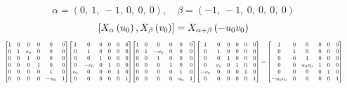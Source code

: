 \documentclass[11pt]{article}
\theoremstyle{definition}
\begin{document}
\[
\alpha = \left( 0, \  1, \  -1, \  0, \  0, \  0\right), \quad \beta = \left( -1, \  -1, \  0, \  0, \  0, \  0\right)
\]
\[
\scaletoalign{\textwidth}{\left[ X_{\alpha}\left(u_{0}\right), X_{\beta}\left(v_{0}\right) \right] = X_{\alpha + \beta}\left(- u_{0} v_{0}\right)}
\]
\[
\scaletoalign{\textwidth}{{\left[\begin{matrix}1 & 0 & 0 & 0 & 0 & 0\\0 & 1 & u_{0} & 0 & 0 & 0\\0 & 0 & 1 & 0 & 0 & 0\\0 & 0 & 0 & 1 & 0 & 0\\0 & 0 & 0 & 0 & 1 & 0\\0 & 0 & 0 & 0 & - u_{0} & 1\end{matrix}\right]} {\left[\begin{matrix}1 & 0 & 0 & 0 & 0 & 0\\0 & 1 & 0 & 0 & 0 & 0\\0 & 0 & 1 & 0 & 0 & 0\\0 & - v_{0} & 0 & 1 & 0 & 0\\v_{0} & 0 & 0 & 0 & 1 & 0\\0 & 0 & 0 & 0 & 0 & 1\end{matrix}\right]} {\left[\begin{matrix}1 & 0 & 0 & 0 & 0 & 0\\0 & 1 & - u_{0} & 0 & 0 & 0\\0 & 0 & 1 & 0 & 0 & 0\\0 & 0 & 0 & 1 & 0 & 0\\0 & 0 & 0 & 0 & 1 & 0\\0 & 0 & 0 & 0 & u_{0} & 1\end{matrix}\right]} {\left[\begin{matrix}1 & 0 & 0 & 0 & 0 & 0\\0 & 1 & 0 & 0 & 0 & 0\\0 & 0 & 1 & 0 & 0 & 0\\0 & v_{0} & 0 & 1 & 0 & 0\\- v_{0} & 0 & 0 & 0 & 1 & 0\\0 & 0 & 0 & 0 & 0 & 1\end{matrix}\right]} = {\left[\begin{matrix}1 & 0 & 0 & 0 & 0 & 0\\0 & 1 & 0 & 0 & 0 & 0\\0 & 0 & 1 & 0 & 0 & 0\\0 & 0 & u_{0} v_{0} & 1 & 0 & 0\\0 & 0 & 0 & 0 & 1 & 0\\- u_{0} v_{0} & 0 & 0 & 0 & 0 & 1\end{matrix}\right]}}
\]
\end{document}
